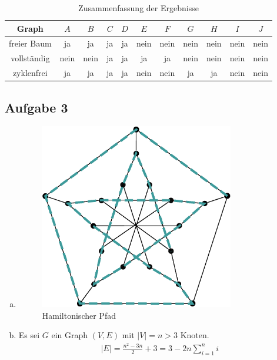 \documentclass[11pt]{article}
\newcommand{\abs}[1]{\left| #1 \right| }
\begin{document}
\begin{table}[h!]
  \centering
  \begin{tabular}{|c|c|c|c|c|c|c|c|c|c|c|}
    \hline
    Graph & $A$ & $B$ & $C$ & $D$ & $E$ & $F$ & $G$ & $H$ & $I$ & $J$ \\
    \hline
    freier Baum & ja & ja & ja & ja & nein & nein & nein & nein & nein & nein \\
    \hline
    vollständig & nein & nein & ja & ja & ja & ja & nein & nein & nein & nein \\
    \hline
    zyklenfrei & ja & ja & ja & ja & nein & nein & ja & ja & nein & nein \\
    \hline
  \end{tabular}
  \caption{Zusammenfassung der Ergebnisse}
  \label{tab:table_a2}
\end{table}

\subsection*{Aufgabe 3}
\begin{enumerate}[a)]
  \item 
    \begin{figure}[h!]
      \centering
      \includegraphics[width=0.8\textwidth]{hamilton_graph}
      \caption{Hamiltonischer Pfad}
      \label{fig:hamilton_graph.eps}
    \end{figure}
  \item
    Es sei $G$ ein Graph $(V, E)$ mit $\abs{V} = n>3$ Knoten.
    \begin{align*}
      |E| =\frac{n^2 - 3n}{2} + 3 = 3-2n \sum_{i=1}^{n} i
    \end{align*}
    
\end{enumerate} 
\end{document}
